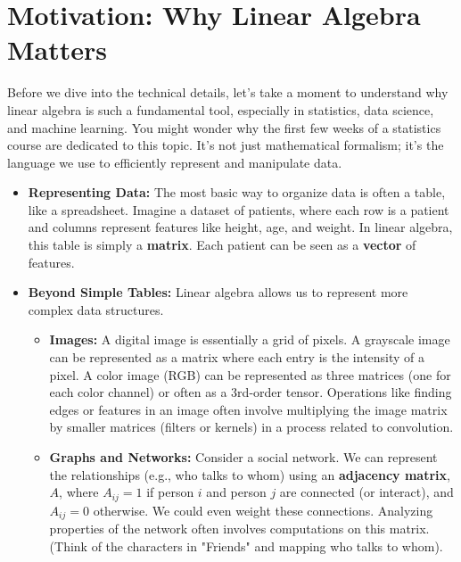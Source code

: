 \documentclass[11pt]{article}
\theoremstyle{definition}
\theoremstyle{remark}
\begin{document}
\section{Motivation: Why Linear Algebra Matters}

Before we dive into the technical details, let's take a moment to understand why linear algebra is such a fundamental tool, especially in statistics, data science, and machine learning. You might wonder why the first few weeks of a statistics course are dedicated to this topic. It's not just mathematical formalism; it's the language we use to efficiently represent and manipulate data.

\begin{itemize}
    \item \textbf{Representing Data:} The most basic way to organize data is often a table, like a spreadsheet. Imagine a dataset of patients, where each row is a patient and columns represent features like height, age, and weight. In linear algebra, this table is simply a \textbf{matrix}. Each patient can be seen as a \textbf{vector} of features.

    \item \textbf{Beyond Simple Tables:} Linear algebra allows us to represent more complex data structures.
        \begin{itemize}
            \item \textbf{Images:} A digital image is essentially a grid of pixels. A grayscale image can be represented as a matrix where each entry is the intensity of a pixel. A color image (RGB) can be represented as three matrices (one for each color channel) or often as a 3rd-order tensor. Operations like finding edges or features in an image often involve multiplying the image matrix by smaller matrices (filters or kernels) in a process related to convolution.
            \item \textbf{Graphs and Networks:} Consider a social network. We can represent the relationships (e.g., who talks to whom) using an \textbf{adjacency matrix}, $A$, where $A_{ij}=1$ if person $i$ and person $j$ are connected (or interact), and $A_{ij}=0$ otherwise. We could even weight these connections. Analyzing properties of the network often involves computations on this matrix. (Think of the characters in "Friends" and mapping who talks to whom).
        \end{itemize}


\end{itemize}
\end{document}
